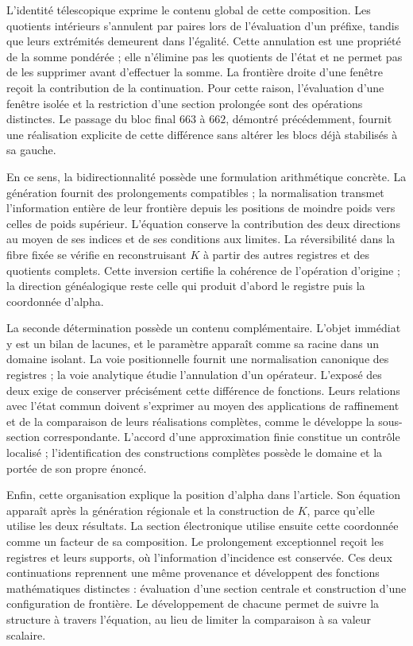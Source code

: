 L'identité télescopique exprime le contenu global de cette composition.
Les quotients intérieurs s'annulent par paires lors de l'évaluation d'un préfixe,
tandis que leurs extrémités demeurent dans l'égalité. Cette annulation est une
propriété de la somme pondérée ; elle n'élimine pas les quotients de l'état et
ne permet pas de les supprimer avant d'effectuer la somme. La frontière droite d'une
fenêtre reçoit la contribution de la continuation. Pour cette raison,
l'évaluation d'une fenêtre isolée et la restriction d'une section
prolongée sont des opérations distinctes. Le passage du bloc final $663$ à
$662$, démontré précédemment, fournit une réalisation explicite de cette
différence sans altérer les blocs déjà stabilisés à sa gauche.

En ce sens, la bidirectionnalité possède une formulation arithmétique
concrète. La génération fournit des prolongements compatibles ; la
normalisation transmet l'information entière de leur frontière depuis les
positions de moindre poids vers celles de poids supérieur. L'équation conserve la
contribution des deux directions au moyen de ses indices et de ses conditions
aux limites. La réversibilité dans la fibre fixée se vérifie en reconstruisant
$K$ à partir des autres registres et des quotients complets. Cette
inversion certifie la cohérence de l'opération d'origine ; la direction
généalogique reste celle qui produit d'abord le registre puis
la coordonnée d'alpha.

La seconde détermination possède un contenu complémentaire. L'objet
immédiat y est un bilan de lacunes, et le paramètre apparaît comme
sa racine dans un domaine isolant. La voie positionnelle fournit une
normalisation canonique des registres ; la voie analytique étudie l'annulation
d'un opérateur. L'exposé des deux exige de conserver précisément
cette différence de fonctions. Leurs relations avec l'état commun doivent
s'exprimer au moyen des applications de raffinement et de la comparaison de
leurs réalisations complètes, comme le développe la sous-section
correspondante. L'accord d'une approximation finie constitue un
contrôle localisé ; l'identification des constructions complètes
possède le domaine et la portée de son propre énoncé.

Enfin, cette organisation explique la position d'alpha dans l'article.
Son équation apparaît après la génération régionale et la construction
de $K$, parce qu'elle utilise les deux résultats. La section électronique utilise
ensuite cette coordonnée comme un facteur de sa composition. Le prolongement
exceptionnel reçoit les registres et leurs supports, où l'information
d'incidence est conservée. Ces deux continuations reprennent une même
provenance et développent des fonctions mathématiques distinctes : évaluation d'une
section centrale et construction d'une configuration de frontière.
Le développement de chacune permet de suivre la structure à travers
l'équation, au lieu de limiter la comparaison à sa valeur scalaire.
